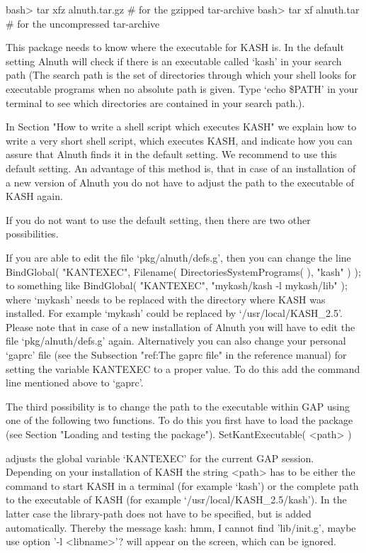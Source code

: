 \beginexample
    bash> tar xfz alnuth.tar.gz        # for the gzipped tar-archive
    bash> tar xf alnuth.tar         # for the uncompressed tar-archive
\endexample


This package needs to know where the executable for KASH is. 
In the default setting Alnuth will check if there is an executable
called `kash' in your search path (The search path is the 
set of directories through which your shell looks for executable 
programs when no absolute path is given. Type
`echo \$PATH'
in your terminal to see which directories are contained in your
search path.).

In Section "How to write a shell script which executes KASH"
we explain how to write a very short shell script,
which executes KASH, 
and indicate how you can assure that Alnuth finds it in the default
setting. 
We recommend to use this default setting.
An advantage of this method is, that in case 
of an installation of a new version of Alnuth you do not have to 
adjust the path to the executable of KASH again. 

If you do not want to use the default setting, then there are
two other possibilities.
 
If you are able to edit the file `pkg/alnuth/defs.g', then 
you can change the line 
\beginexample
    BindGlobal( "KANTEXEC", Filename( DirectoriesSystemPrograms( ), "kash" ) );
\endexample
to something like
\beginexample
    BindGlobal( "KANTEXEC", "mykash/kash -l mykash/lib" );
\endexample 
where `mykash' needs to be replaced with the directory where KASH
was installed. For example `mykash' could be replaced by
`/usr/local/KASH_2.5'. Please note that in case of a new installation 
of Alnuth you will have to edit the file `pkg/alnuth/defs.g'
again. Alternatively you can also change your personal `gaprc' file (see 
the Subsection "ref:The gaprc file" in the reference manual) for setting the
variable KANTEXEC to a proper value. To do this add the command line mentioned
above to `gaprc'.
 
The third possibility is to change the path to the executable within GAP using
one of the following two functions. To do this you first have to load the
package (see Section "Loading and testing the package").
\> SetKantExecutable( <path> )

adjusts the global variable `KANTEXEC' for the current GAP session. Depending
on your installation of KASH the string <path> has to be either the command
to start KASH in a terminal (for example `kash') 
or the complete path to the executable of KASH 
(for example `/usr/local/KASH_2.5/kash'). In
the latter case the library-path does not have to be specified, but is added
automatically. Thereby the message
\beginexample
    kash: hmm, I cannot find 'lib/init.g', maybe use option '-l <libname>'?
\endexample
will appear on the screen, which can be ignored.

